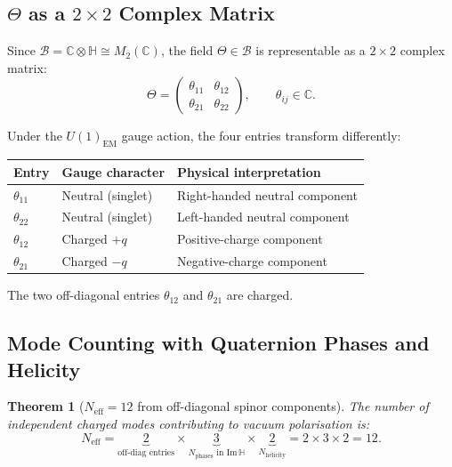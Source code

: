 \documentclass[12pt,a4paper]{article}
\newtheorem{theorem}{Theorem}[section]
\theoremstyle{definition}
\theoremstyle{remark}
\begin{document}
\subsection{$\Theta$ as a $2\times 2$ Complex Matrix}
\label{ssec:neff12:R4:matrix}

Since $\mathcal{B} = \mathbb{C}\otimes\mathbb{H} \cong M_2(\mathbb{C})$,
the field $\Theta \in \mathcal{B}$ is representable as a $2\times 2$ complex matrix:
\begin{equation}
  \Theta = \begin{pmatrix} \theta_{11} & \theta_{12} \\ \theta_{21} & \theta_{22} \end{pmatrix},
  \qquad \theta_{ij} \in \mathbb{C}.
  \label{eq:neff12:R4:matrix}
\end{equation}

Under the $U(1)_{\mathrm{EM}}$ gauge action, the four entries transform differently:

\begin{center}
\begin{tabular}{lll}
\toprule
Entry & Gauge character & Physical interpretation \\
\midrule
$\theta_{11}$ & Neutral (singlet) & Right-handed neutral component \\
$\theta_{22}$ & Neutral (singlet) & Left-handed neutral component \\
$\theta_{12}$ & Charged $+q$ & Positive-charge component \\
$\theta_{21}$ & Charged $-q$ & Negative-charge component \\
\bottomrule
\end{tabular}
\end{center}

The two off-diagonal entries $\theta_{12}$ and $\theta_{21}$ are charged.

\subsection{Mode Counting with Quaternion Phases and Helicity}
\label{ssec:neff12:R4:counting}

\begin{theorem}[$N_{\mathrm{eff}} = 12$ from off-diagonal spinor components]
\label{thm:neff12:R4}
The number of independent charged modes contributing to vacuum polarisation is:
\begin{equation}
  N_{\mathrm{eff}}
  = \underbrace{2}_{\text{off-diag entries}}
    \times
    \underbrace{3}_{N_{\mathrm{phases}}\text{ in Im}\,\mathbb{H}}
    \times
    \underbrace{2}_{N_{\mathrm{helicity}}}
  = 2 \times 3 \times 2
  = 12.
  \label{eq:neff12:R4}
\end{equation}
\end{theorem}
\end{document}
